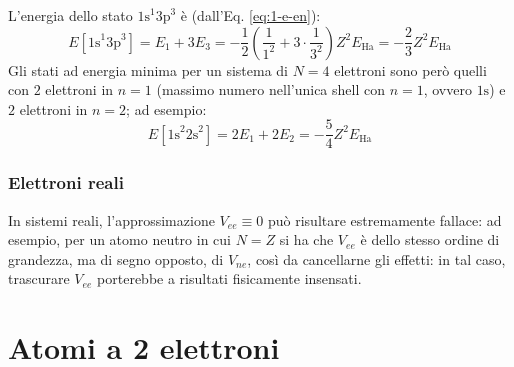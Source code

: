 \begin{example}{}{}
	L'energia dello stato $ \text{1s}^1 \text{3p}^3 $ è (dall'Eq. \ref{eq:1-e-en}):
	\begin{equation*}
		E[\text{1s}^1 \text{3p}^3] = E_1 + 3 E_3 = - \frac{1}{2} \left( \frac{1}{1^2} + 3 \cdot \frac{1}{3^2} \right) Z^2 E_\text{Ha} = - \frac{2}{3} Z^2 E_\text{Ha}
	\end{equation*}
	Gli stati ad energia minima per un sistema di $ N = 4 $ elettroni sono però quelli con $ 2 $ elettroni in $ n = 1 $ (massimo numero nell'unica shell con $ n = 1 $, ovvero $ \text{1s} $) e $ 2 $ elettroni in $ n = 2 $; ad esempio:
	\begin{equation*}
		E[\text{1s}^2 \text{2s}^2] = 2 E_1 + 2 E_2 = - \frac{5}{4} Z^2 E_\text{Ha}
	\end{equation*}
\end{example}

\subsubsection{Elettroni reali}

In sistemi reali, l'approssimazione $ V_{ee} \equiv 0 $ può risultare estremamente fallace: ad esempio, per un atomo neutro in cui $ N = Z $ si ha che $ V_{ee} $ è dello stesso ordine di grandezza, ma di segno opposto, di $ V_{ne} $, così da cancellarne gli effetti: in tal caso, trascurare $ V_{ee} $ porterebbe a risultati fisicamente insensati.

\section{Atomi a 2 elettroni}


